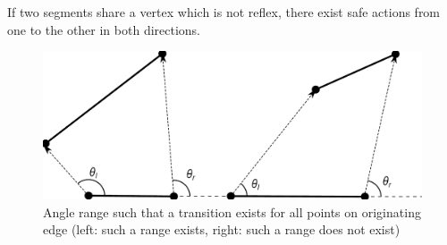 \documentclass[]{svproc}  %
\begin{document}
If two segments share a vertex which is not reflex, there exist safe actions
from one to the other in both directions.

%
%


\begin{figure}
    \centering
    \includegraphics[width=0.7\linewidth]{figures/bouncerange_min.pdf}
    \caption{Angle range such that a transition exists for all points on
originating edge (left: such a range exists, right: such a range does not
exist)}
\label{fig:bounce_range}
\end{figure}
\end{document}
